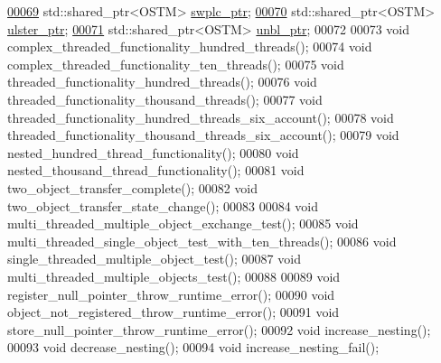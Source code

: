 \begin{DoxyCode}
\hypertarget{_my_test_c_ase_8h_source.tex_l00069}{}\hyperlink{class_my_test_c_ase_aa8ccae9a5a7feb5bc47591c55a82d0cd_aa8ccae9a5a7feb5bc47591c55a82d0cd}{00069}     std::shared\_ptr<OSTM> \hyperlink{class_my_test_c_ase_aa8ccae9a5a7feb5bc47591c55a82d0cd_aa8ccae9a5a7feb5bc47591c55a82d0cd}{swplc\_ptr};
\hypertarget{_my_test_c_ase_8h_source.tex_l00070}{}\hyperlink{class_my_test_c_ase_a4f9f72374d3d15be7cdf16412c4d7ed3_a4f9f72374d3d15be7cdf16412c4d7ed3}{00070}     std::shared\_ptr<OSTM> \hyperlink{class_my_test_c_ase_a4f9f72374d3d15be7cdf16412c4d7ed3_a4f9f72374d3d15be7cdf16412c4d7ed3}{ulster\_ptr};
\hypertarget{_my_test_c_ase_8h_source.tex_l00071}{}\hyperlink{class_my_test_c_ase_a0ca634b597d6c0e136d632268853d5a7_a0ca634b597d6c0e136d632268853d5a7}{00071}     std::shared\_ptr<OSTM> \hyperlink{class_my_test_c_ase_a0ca634b597d6c0e136d632268853d5a7_a0ca634b597d6c0e136d632268853d5a7}{unbl\_ptr};
00072     
00073     \textcolor{keywordtype}{void} complex\_threaded\_functionality\_hundred\_threads();
00074     \textcolor{keywordtype}{void} complex\_threaded\_functionality\_ten\_threads();
00075     \textcolor{keywordtype}{void} threaded\_functionality\_hundred\_threads();
00076     \textcolor{keywordtype}{void} threaded\_functionality\_thousand\_threads();
00077     \textcolor{keywordtype}{void} threaded\_functionality\_hundred\_threads\_six\_account();
00078     \textcolor{keywordtype}{void} threaded\_functionality\_thousand\_threads\_six\_account();
00079     \textcolor{keywordtype}{void} nested\_hundred\_thread\_functionality();
00080     \textcolor{keywordtype}{void} nested\_thousand\_thread\_functionality();
00081     \textcolor{keywordtype}{void} two\_object\_transfer\_complete();
00082     \textcolor{keywordtype}{void} two\_object\_transfer\_state\_change();
00083     
00084     \textcolor{keywordtype}{void} multi\_threaded\_multiple\_object\_exchange\_test();
00085     \textcolor{keywordtype}{void} multi\_threaded\_single\_object\_test\_with\_ten\_threads();
00086     \textcolor{keywordtype}{void} single\_threaded\_multiple\_object\_test();
00087     \textcolor{keywordtype}{void} multi\_threaded\_multiple\_objects\_test();
00088     
00089     \textcolor{keywordtype}{void} register\_null\_pointer\_throw\_runtime\_error();
00090     \textcolor{keywordtype}{void} object\_not\_registered\_throw\_runtime\_error();
00091     \textcolor{keywordtype}{void} store\_null\_pointer\_throw\_runtime\_error();
00092     \textcolor{keywordtype}{void} increase\_nesting();
00093     \textcolor{keywordtype}{void} decrease\_nesting();
00094     \textcolor{keywordtype}{void} increase\_nesting\_fail();

\end{DoxyCode}
